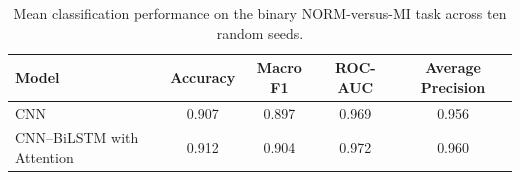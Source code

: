 \begin{table}[htbp]
\centering
\begin{tabular}{lcccc}
\toprule
Model & Accuracy & Macro F1 & ROC-AUC & Average Precision \\
\midrule
CNN                        & 0.907 & 0.897 & 0.969 & 0.956 \\
CNN--BiLSTM with Attention & 0.912 & 0.904 & 0.972 & 0.960 \\
\bottomrule
\end{tabular}
\caption{Mean classification performance on the binary NORM-versus-MI task across ten random seeds.}
\label{tab:binary_summary}
\end{table}
